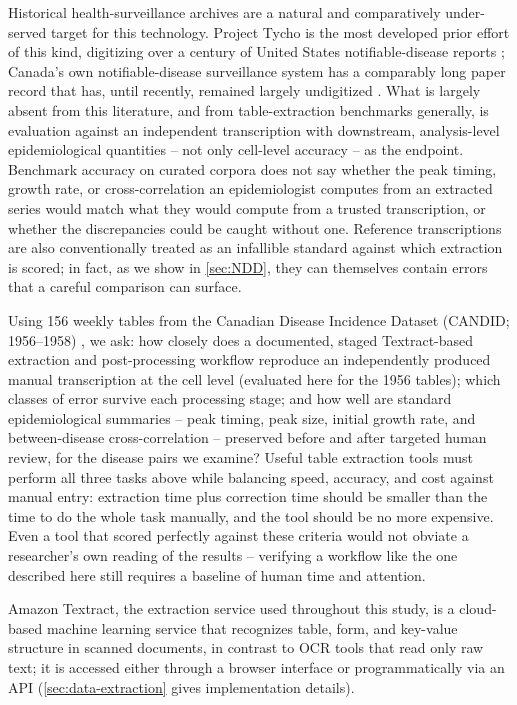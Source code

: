 \documentclass[12pt]{article}
\begin{document}
Historical health-surveillance archives are a natural and comparatively under-served target for this technology. Project Tycho is the most developed prior effort of this kind, digitizing over a century of United States notifiable-disease reports \cite{van2013contagious,van2018project}; Canada's own notifiable-disease surveillance system has a comparably long paper record that has, until recently, remained largely undigitized \cite{sockett1996communicable,totten2019updates}. What is largely absent from this literature, and from table-extraction benchmarks generally, is evaluation against an independent transcription with downstream, analysis-level epidemiological quantities -- not only cell-level accuracy -- as the endpoint. Benchmark accuracy on curated corpora does not say whether the peak timing, growth rate, or cross-correlation an epidemiologist computes from an extracted series would match what they would compute from a trusted transcription, or whether the discrepancies could be caught without one. Reference transcriptions are also conventionally treated as an infallible standard against which extraction is scored; in fact, as we show in \cref{sec:NDD}, they can themselves contain errors that a careful comparison can surface.

Using 156 weekly tables from the Canadian Disease Incidence Dataset (CANDID; 1956--1958) \cite{CANDID}, we ask: how closely does a documented, staged Textract-based extraction and post-processing workflow reproduce an independently produced manual transcription at the cell level (evaluated here for the 1956 tables); which classes of error survive each processing stage; and how well are standard epidemiological summaries -- peak timing, peak size, initial growth rate, and between-disease cross-correlation -- preserved before and after targeted human review, for the disease pairs we examine? Useful table extraction tools must perform all three tasks above while balancing speed, accuracy, and cost against manual entry: extraction time plus correction time should be smaller than the time to do the whole task manually, and the tool should be no more expensive. Even a tool that scored perfectly against these criteria would not obviate a researcher's own reading of the results \cite{STADLER2024108386} -- verifying a workflow like the one described here still requires a baseline of human time and attention.

Amazon Textract, the extraction service used throughout this study, is a cloud-based machine learning service that recognizes table, form, and key-value structure in scanned documents, in contrast to OCR tools that read only raw text; it is accessed either through a browser interface or programmatically via an API (\cref{sec:data-extraction} gives implementation details).
\end{document}

